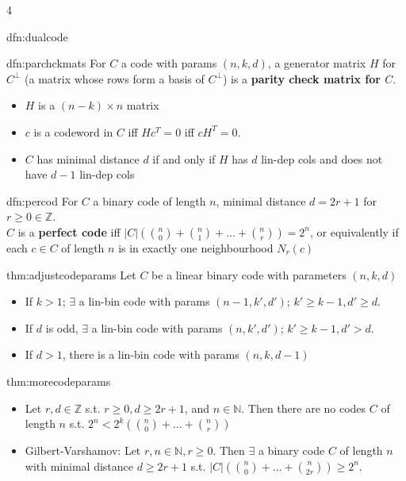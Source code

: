 \documentclass[landscape, 8pt]{extarticle}
\begin{document}
\begin{multicols*}{4}
\begin{dfn}{dfn:dualcode}{ }
		\end{dfn}
		
		
		\begin{dfn}{dfn:parchckmats}{ }
		For $C$ a code with params $(n, k, d)$, a generator matrix $H$ for $C^\perp$ (a matrix whose rows form a basis of $C^\perp$) is a \textbf{parity check matrix for $C$}.
		\begin{itemize}
			\item $H$ is a $(n-k) \times n$ matrix
			\item $c$ is a codeword in $C$ iff $Hc^T = 0$ iff $cH^T = 0$.
			\item $C$ has minimal distance $d$ if and only if $H$ has $d$ lin-dep cols and does not have $d-1$ lin-dep cols
		\end{itemize} 
		
		\end{dfn}
		
		
		\begin{dfn}{dfn:percod}{ }
		For $C$ a binary code of length $n$, minimal distance $d = 2r + 1$ for $r \ge 0\in \mathbb{Z}$.\\
		$C$ is a \textbf{perfect code} iff $\left|C\right| \left(\binom{n}{0} + \binom{n}{1} + \dotsc + \binom{n}{r}\right) = 2^n$, or equivalently if each $c\in C$ of length $n$ is in exactly one neighbourhood $N_r(c)$
		
		\end{dfn}
		
		
		\begin{thm}{thm:adjustcodeparams}{ }
		Let $C$ be a linear binary code with parameters $(n, k, d)$
		\begin{itemize}
			\item If $k>1$; $\exists$ a lin-bin code with params $(n-1, k', d')$;  $k' \ge k-1, d' \ge d$.
			\item If $d$ is odd, $\exists$ a lin-bin code with params $(n, k', d')$; $k' \ge k-1, d' > d$.
			\item If $d>1$, there is a lin-bin code with params $(n, k, d-1)$
		\end{itemize}
		
		\end{thm}
		
		
		\begin{thm}{thm:morecodeparams}{ }
		\begin{itemize}
			\item Let $r, d\in \mathbb{Z}$ s.t. $r \ge 0, d \ge 2r+1$, and $n\in \mathbb{N}$. Then there are no codes $C$ of length $n$ s.t. $2^n < 2^k \left(\binom{n}{0} + \dots + \binom{n}{r}\right)$
			\item Gilbert-Varshamov: Let $r, n\in \mathbb{N}, r \ge 0$. Then $\exists$ a binary code $C$ of length $n$ with minimal distance $d \ge 2r+1$ s.t. $\left|C\right|\left(\binom{n}{0} + \dots + \binom{n}{2r}\right) \ge 2^n$.
		\end{itemize}
		

\end{thm}
\end{multicols*}
\end{document}
